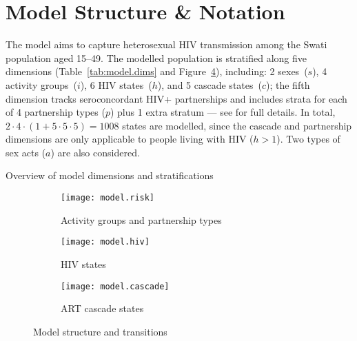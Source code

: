 \section{Model Structure \& Notation}\label{mod.str}
The model aims to capture heterosexual HIV transmission among the Swati population aged 15--49.
The modelled population is stratified along five dimensions
(Table~\ref{tab:model.dims} and Figure~\ref{fig:model}), including:
2 sexes~($s$), 4 activity groups~($i$), 6 HIV states~($h$), and 5 cascade states~($c$);
the fifth dimension tracks seroconcordant HIV+ partnerships
and includes strata for each of 4 partnership types ($p$) plus 1 extra stratum
--- see  for full details.
In total, $2 \cdot 4 \cdot (1 + 5 \cdot 5 \cdot 5) = 1008$ states are modelled,
since the cascade and partnership dimensions are only applicable to people living with HIV ($h>1$).
Two types of sex acts ($a$) are also considered.
\begin{table}[h]
  \centering
  \caption{Overview of model dimensions and stratifications}
  \label{tab:model.dims}
  
\end{table}
\begin{figure}[h]
  \begin{subfigure}{\linewidth}
    \texttt{[image: model.risk]}
    \caption{Activity groups and partnership types}
    \label{fig:model.risk}
  \end{subfigure}
  \begin{subfigure}{\linewidth}
    \texttt{[image: model.hiv]}
    \caption{HIV states}
    \label{fig:model.hiv}
  \end{subfigure}
  \begin{subfigure}{\linewidth}
    \texttt{[image: model.cascade]}
    \caption{ART cascade states}
    \label{fig:model.cascade}
  \end{subfigure}
  \caption{Model structure and transitions}
  \label{fig:model}
\end{figure}
